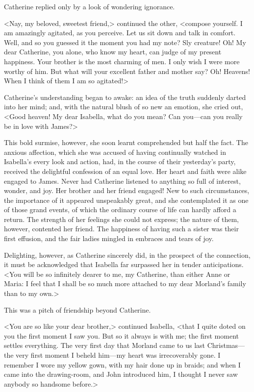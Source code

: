  Catherine replied only by a look of wondering ignorance. 

 <Nay, my beloved, sweetest friend,> continued the other, <compose yourself. I am amazingly agitated, as you perceive. Let us sit down and talk in comfort. Well, and so you guessed it the moment you had my note? Sly creature! Oh! My dear Catherine, you alone, who know my heart, can judge of my present happiness. Your brother is the most charming of men. I only wish I were more worthy of him. But what will your excellent father and mother say? Oh! Heavens! When I think of them I am so agitated!> 

 Catherine's understanding began to awake: an idea of the truth suddenly darted into her mind; and, with the natural blush of so new an emotion, she cried out, <Good heaven! My dear Isabella, what do you mean? Can you—can you really be in love with James?> 

 This bold surmise, however, she soon learnt comprehended but half the fact. The anxious affection, which she was accused of having continually watched in Isabella's every look and action, had, in the course of their yesterday's party, received the delightful confession of an equal love. Her heart and faith were alike engaged to James. Never had Catherine listened to anything so full of interest, wonder, and joy. Her brother and her friend engaged! New to such circumstances, the importance of it appeared unspeakably great, and she contemplated it as one of those grand events, of which the ordinary course of life can hardly afford a return. The strength of her feelings she could not express; the nature of them, however, contented her friend. The happiness of having such a sister was their first effusion, and the fair ladies mingled in embraces and tears of joy. 

 Delighting, however, as Catherine sincerely did, in the prospect of the connection, it must be acknowledged that Isabella far surpassed her in tender anticipations. <You will be so infinitely dearer to me, my Catherine, than either Anne or Maria: I feel that I shall be so much more attached to my dear Morland's family than to my own.> 

 This was a pitch of friendship beyond Catherine. 

 <You are so like your dear brother,> continued Isabella, <that I quite doted on you the first moment I saw you. But so it always is with me; the first moment settles everything. The very first day that Morland came to us last Christmas—the very first moment I beheld him—my heart was irrecoverably gone. I remember I wore my yellow gown, with my hair done up in braids; and when I came into the drawing-room, and John introduced him, I thought I never saw anybody so handsome before.> 

